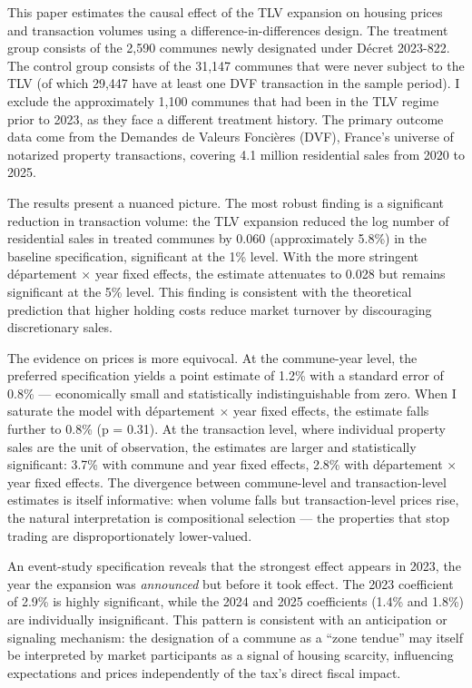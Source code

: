 \documentclass[12pt]{article}
\begin{document}
This paper estimates the causal effect of the TLV expansion on housing prices and transaction volumes using a difference-in-differences design. The treatment group consists of the 2,590 communes newly designated under D\'ecret 2023-822. The control group consists of the 31,147 communes that were never subject to the TLV (of which 29,447 have at least one DVF transaction in the sample period). I exclude the approximately 1,100 communes that had been in the TLV regime prior to 2023, as they face a different treatment history. The primary outcome data come from the Demandes de Valeurs Fonci\`eres (DVF), France's universe of notarized property transactions, covering 4.1 million residential sales from 2020 to 2025.

The results present a nuanced picture. The most robust finding is a significant reduction in transaction volume: the TLV expansion reduced the log number of residential sales in treated communes by 0.060 (approximately 5.8\%) in the baseline specification, significant at the 1\% level. With the more stringent d\'epartement $\times$ year fixed effects, the estimate attenuates to 0.028 but remains significant at the 5\% level. This finding is consistent with the theoretical prediction that higher holding costs reduce market turnover by discouraging discretionary sales.

The evidence on prices is more equivocal. At the commune-year level, the preferred specification yields a point estimate of 1.2\% with a standard error of 0.8\% --- economically small and statistically indistinguishable from zero. When I saturate the model with d\'epartement $\times$ year fixed effects, the estimate falls further to 0.8\% (p = 0.31). At the transaction level, where individual property sales are the unit of observation, the estimates are larger and statistically significant: 3.7\% with commune and year fixed effects, 2.8\% with d\'epartement $\times$ year fixed effects. The divergence between commune-level and transaction-level estimates is itself informative: when volume falls but transaction-level prices rise, the natural interpretation is compositional selection --- the properties that stop trading are disproportionately lower-valued.

An event-study specification reveals that the strongest effect appears in 2023, the year the expansion was \textit{announced} but before it took effect. The 2023 coefficient of 2.9\% is highly significant, while the 2024 and 2025 coefficients (1.4\% and 1.8\%) are individually insignificant. This pattern is consistent with an anticipation or signaling mechanism: the designation of a commune as a ``zone tendue'' may itself be interpreted by market participants as a signal of housing scarcity, influencing expectations and prices independently of the tax's direct fiscal impact.
\end{document}
